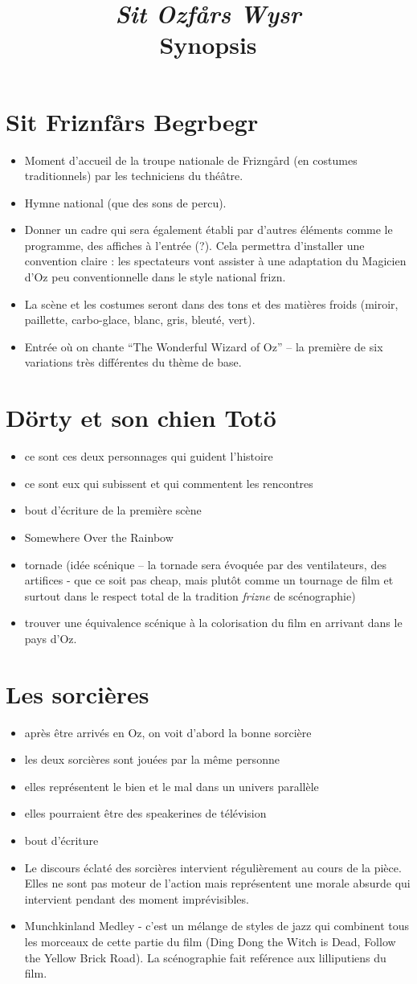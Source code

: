 \documentclass[a4paper]{article}
\title{\emph{Sit Ozfårs Wysr} \\ Synopsis}
\author{}
\date{}
\newcommand{\mssection}[1]{\section{#1}}
\begin{document}
\maketitle
\mssection{Sit Friznfårs Begrbegr}
\begin{itemize}
\item Moment d'accueil de la troupe nationale de Frizngård (en costumes
traditionnels) par les techniciens du théâtre.
\item Hymne national (que des sons de percu).
\item Donner un cadre qui sera également établi par d'autres éléments comme
le programme, des affiches à l'entrée (?). Cela permettra d'installer une
convention claire : les spectateurs vont assister à une adaptation du
Magicien d'Oz peu conventionnelle dans le style national frizn.
\item La scène et les costumes seront dans des tons et des matières froids
(miroir, paillette, carbo-glace, blanc, gris, bleuté, vert).
\item Entrée où on chante ``The Wonderful Wizard of Oz'' -- la première de
six variations très différentes du thème de base.
\end{itemize}
\mssection{Dörty et son chien Totö}
\begin{itemize}
\item ce sont ces deux personnages qui guident l'histoire
\item ce sont eux qui subissent et qui commentent les rencontres
\item bout d'écriture de la première scène
\item Somewhere Over the Rainbow
\item tornade (idée scénique -- la tornade sera évoquée par des
ventilateurs, des artifices - que ce soit pas cheap, mais plutôt comme un
tournage de film et surtout dans le respect total de la tradition
\emph{frizne} de scénographie)
\item trouver une équivalence scénique à la colorisation du film en arrivant
dans le pays d'Oz.
\end{itemize}
\mssection{Les sorcières}
\begin{itemize}
\item après être arrivés en Oz, on voit d'abord la bonne sorcière
\item les deux sorcières sont jouées par la même personne
\item elles représentent le bien et le mal dans un univers parallèle
\item elles pourraient être des speakerines de télévision
\item bout d'écriture
\item Le discours éclaté des sorcières intervient régulièrement
au cours de la pièce. Elles ne sont pas moteur de l'action mais représentent
une morale absurde qui intervient pendant des moment imprévisibles.
\item Munchkinland Medley - c'est un mélange de styles de jazz qui combinent
tous les morceaux de cette partie du film (Ding Dong the Witch is Dead,
Follow the Yellow Brick Road). La scénographie fait reférence
aux lilliputiens du film.
\end{itemize}
\end{document}
